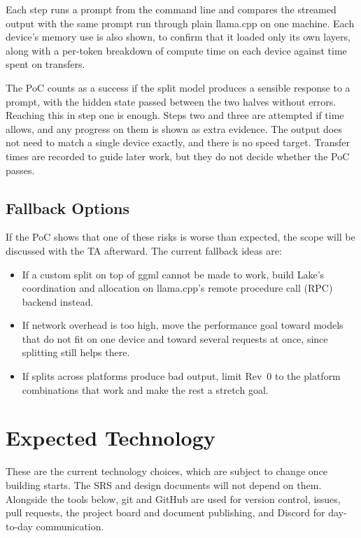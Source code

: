 \documentclass{article}
\begin{document}
Each step runs a prompt from the command line and compares the streamed output
with the same prompt run through plain llama.cpp on one machine. Each device's
memory use is also shown, to confirm that it loaded only its own layers, along
with a per-token breakdown of compute time on each device against time spent
on transfers.

The PoC counts as a success if the split model produces a sensible response
to a prompt, with the hidden state passed between the two halves without
errors. Reaching this in step one is enough. Steps two and three are attempted
if time allows, and any progress on them is shown as extra evidence. The output
does not need to match a single device exactly, and there is no speed target.
Transfer times are recorded to guide later work, but they do not decide
whether the PoC passes.

\subsection{Fallback Options}

If the PoC shows that one of these risks is worse than expected, the scope
will be discussed with the TA afterward. The current fallback ideas are:

\begin{itemize}
  \item If a custom split on top of ggml cannot be made to work, build Lake's
    coordination and allocation on llama.cpp's remote procedure call (RPC)
    backend instead.
  \item If network overhead is too high, move the performance goal toward
    models that do not fit on one device and toward several requests at once,
    since splitting still helps there.
  \item If splits across platforms produce bad output, limit Rev~0 to the
    platform combinations that work and make the rest a stretch goal.
\end{itemize}

\section{Expected Technology}
\label{SecTech}

These are the current technology choices, which are subject to change once
building starts. The SRS and design documents will not depend on them.
Alongside the tools below, git and GitHub are used for version control,
issues, pull requests, the project board and document publishing, and Discord
for day-to-day communication.
\end{document}
